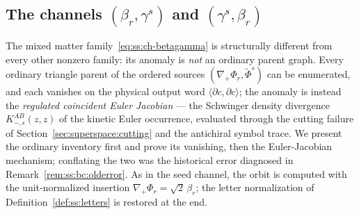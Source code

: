 
\subsection{The channels $(\beta_r,\gamma^s)$ and $(\gamma^s,\beta_r)$}%
\label{sec:superspace:bc}

The mixed matter family~\eqref{eq:ss:ch-betagamma} is structurally different
from every other nonzero family: its anomaly is \emph{not} an ordinary parent
graph. Every ordinary triangle parent of the ordered sources
$(\nabla_{+}\Phi_{r},\widetilde\Phi^{s})$ can be enumerated, and each vanishes
on the physical output word $\langle\partial c,\partial c\rangle$; the anomaly
is instead the \emph{regulated coincident Euler Jacobian} --- the Schwinger
density divergence $K_{-,\epsilon}^{AB}(z,z)$ of the kinetic Euler occurrence,
evaluated through the cutting failure of Section~\ref{sec:superspace:cutting}
and the antichiral symbol trace. We present the ordinary inventory first and
prove its vanishing, then the Euler-Jacobian mechanism; conflating the two was
the historical error diagnosed in Remark~\ref{rem:ss:bc:olderror}. As in the
seed channel, the orbit is computed with the unit-normalized insertion
$\nabla_{+}\Phi_{r}=\sqrt2\,\beta_{r}$; the letter normalization of
Definition~\ref{def:ss:letters} is restored at the end.

